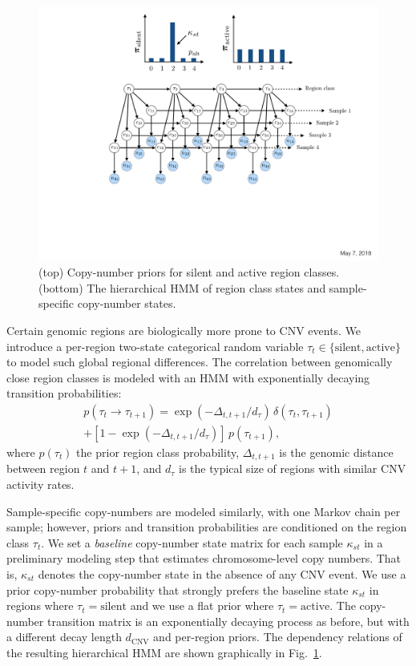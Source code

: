 \documentclass[sigplan]{acmart}\settopmatter{printfolios=true,printccs=false,printacmref=false}
\begin{document}
\begin{figure}
\includegraphics[width=\columnwidth]{figures/germline-cnv-caller-model/hhmm.pdf}
\caption{(top) Copy-number priors for silent and active region classes. (bottom) The hierarchical HMM of region class states and sample-specific copy-number states.}
\label{fig:hhmm}
\end{figure}
Certain genomic regions are biologically more prone to CNV events. We introduce a per-region two-state categorical random variable $\tau_t \in \{\mathrm{silent}, \mathrm{active}\}$ to model such global regional differences. The correlation between genomically close region classes is modeled with an HMM with exponentially decaying transition probabilities:
\begin{multline}
p(\tau_t \rightarrow \tau_{t+1}) = \exp(-\Delta_{t, t+1}/d_\tau) \, \delta(\tau_t, \tau_{t+1}) \\+ [1 - \exp(-\Delta_{t, t+1}/d_\tau)]\,p(\tau_{t+1}),
\end{multline}
where $p(\tau_{t})$ the prior region class probability, $\Delta_{t, t+1}$ is the genomic distance between region $t$ and $t+1$, and $d_\tau$ is the typical size of regions with similar CNV activity rates.

Sample-specific copy-numbers are modeled similarly, with one Markov chain per sample; however, priors and transition probabilities are conditioned on the region class $\tau_t$. We set a {\em baseline} copy-number state matrix for each sample $\kappa_{st}$ in a preliminary modeling step that estimates chromosome-level copy numbers. That is, $\kappa_{st}$ denotes the copy-number state in the absence of any CNV event. We use a prior copy-number probability that strongly prefers the baseline state $\kappa_{st}$ in regions where $\tau_t = \mathrm{silent}$ and we use a flat prior where $\tau_t = \mathrm{active}$. The copy-number transition matrix is an exponentially decaying process as before, but with a different decay length $d_\mathrm{CNV}$ and per-region priors. The dependency relations of the resulting hierarchical HMM are shown graphically in Fig.~\ref{fig:hhmm}.\\
\end{document}
